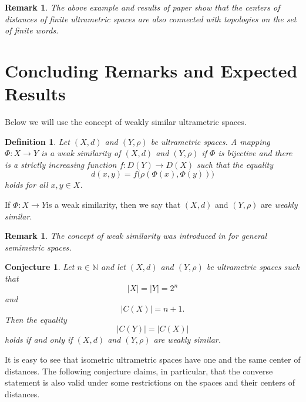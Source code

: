 \documentclass[pdflatex,sn-mathphys-num]{sn-jnl}%
\theoremstyle{thmstyleone}%
\newtheorem{Conjecture}[Theorem]{Conjecture}
\theoremstyle{thmstyletwo}%
\newtheorem{Remark}[Theorem]{Remark}
\theoremstyle{thmstylethree}%
\newtheorem{Definition}[Theorem]{Definition}
\theoremstyle{thmstyletwo}%
\newtheorem{remark}{Remark}%
\theoremstyle{thmstylethree}%
\begin{document}
\begin{Remark}\label{kartf} The above example and results of paper \cite{Staiger2024} show that the centers of distances of finite ultrametric spaces are also connected with topologies on the set of finite words.
\end{Remark}









\section{Concluding Remarks and Expected Results}\label{sec4}

Below we will use the concept of weakly similar ultrametric spaces.


\begin{Definition} Let $(X,d)$ and $(Y,\rho)$ be ultrametric spaces. A mapping $\Phi : X \to Y$ is a {\it weak similarity} of $(X,d)$ and $(Y,\rho)$ if $\Phi$ is bijective and there is a strictly increasing function $f : D(Y) \to D(X)$ such that the equality
\[
d(x,y) = f\bigl(\rho(\Phi(x),\Phi(y))\bigr)
\]
holds for all $x,y \in X$.
\end{Definition}

If $\Phi: X \to Y$is a weak similarity, then we say that $(X, d)$ and $(Y,\rho)$ are {\it weakly similar}.




\begin{remark}
The concept of weak similarity was introduced in \cite{DP2013AMH} for general semimetric spaces. 
\end{remark}


\begin{Conjecture}
Let $n \in \mathbb{N}$ and let $(X,d)$ and $(Y,\rho)$ be ultrametric spaces such that
\begin{equation}\label{eq:4.1}
|X| = |Y| = 2^n
\end{equation}
and
\begin{equation}\label{eq:4.2}
|C(X)| = n + 1.
\end{equation}
Then the equality
\begin{equation*}
|C(Y)| = |C(X)|
\end{equation*}
holds if and only if $(X,d)$ and $(Y,\rho)$ are weakly similar.
\end{Conjecture}


It is easy to see that isometric ultrametric spaces have one and the same center of distances. The following conjecture claims, in particular, that the converse statement is also valid under some restrictions on the spaces  and their centers of distances.
\end{document}
